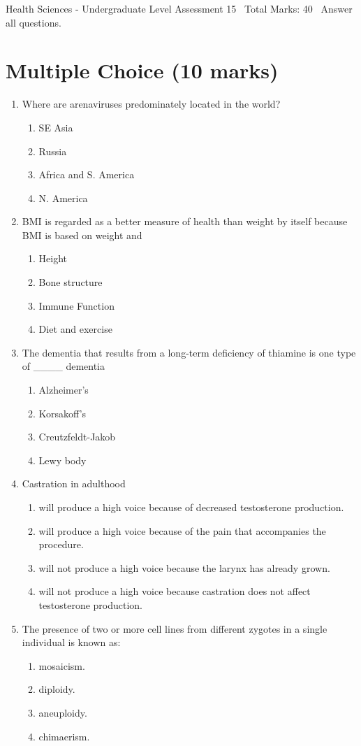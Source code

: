 \documentclass[12pt]{article}
\begin{document}
\begin{center}
Health Sciences - Undergraduate Level Assessment 15 \
Total Marks: 40 \
Answer all questions.
\end{center}

\section*{Multiple Choice (10 marks)}
\begin{enumerate}[label=\arabic*.]
\item Where are arenaviruses predominately located in the world?
\begin{enumerate}[label=(\alph*)]
    \item SE Asia
    \item Russia
    \item Africa and S. America
    \item N. America
\end{enumerate}
\item BMI is regarded as a better measure of health than weight by itself because BMI is based on weight and
\begin{enumerate}[label=(\alph*)]
    \item Height
    \item Bone structure
    \item Immune Function
    \item Diet and exercise
\end{enumerate}
\item The dementia that results from a long-term deficiency of thiamine is one type of \_\_\_\_ dementia
\begin{enumerate}[label=(\alph*)]
    \item Alzheimer's
    \item Korsakoff's
    \item Creutzfeldt-Jakob
    \item Lewy body
\end{enumerate}
\item Castration in adulthood
\begin{enumerate}[label=(\alph*)]
    \item will produce a high voice because of decreased testosterone production.
    \item will produce a high voice because of the pain that accompanies the procedure.
    \item will not produce a high voice because the larynx has already grown.
    \item will not produce a high voice because castration does not affect testosterone production.
\end{enumerate}
\item The presence of two or more cell lines from different zygotes in a single individual is known as:
\begin{enumerate}[label=(\alph*)]
    \item mosaicism.
    \item diploidy.
    \item aneuploidy.
    \item chimaerism.
\end{enumerate}
\end{enumerate}
\end{document}
